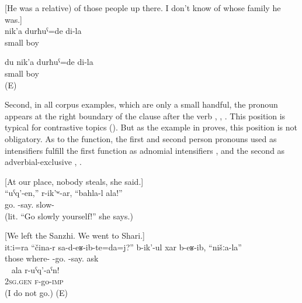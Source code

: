 \begin{exe}
	\ex	\label{ex:ex:I was a little boy@BREFLIST}
	\begin{xlist}
	\ex	\label{ex:I was a little boy@BREFL} [He was a relative) of those people up there. I don't know of whose family he was.] \\
	\gll	nik'a	durħuˁ=de	di-la\\
		small	boy	\\
	\glt	{}
	
		\ex	\label{ex:I was a little boy@BREFL2} 
	 du nik'a	durħuˁ=de	di-la\\
		{}  small	boy	\\
	\glt	 {} (E)
		\end{xlist}
\end{exe}

Second, in all corpus examples, which are only a small handful, the  pronoun appears at the right boundary of the clause after the verb , , . This position is typical for contrastive topics (). But as the example in  proves, this position is not obligatory. As to the function, the first and second person  pronouns used as intensifiers fulfill the first function as adnomial intensifiers ,  and the second as adverbial-exclusive  , .

\begin{exe}
		\ex	\label{You can leave on your own, she says, without worries.} [‎‎At our place, nobody steals, she said.]\\
		\gll	``uˁq'-en,''	r-ik'ʷ-ar,	``bahla-l	ala!''\\
			go.	-say.	slow-	 \\
		\glt	{} (lit. ``Go slowly yourself!'' she says.)
		
			\ex	\label{They asked us, where did you come from?} [We left the Sanzhi. We went to Shari.]\\
		\gll	itːi=ra	``čina-r	sa-d-eʁ-ib-te=da=j?''	b-ik'-ul	xar	b-eʁ-ib,	``nišːa-la''\\
			those	where-	-go.	-say.	ask		\\
		\glt	{} 
\
			\ex	\label{ex:(You) yourself go awayREFL}
		\gll	ala	r-uˁq'-aˁn!\\
			2\textsc{sg}.\textsc{gen}	\textsc{f}-go-\textsc{imp}\\
		\glt	{} (I do not go.) (E)
\end{exe}


